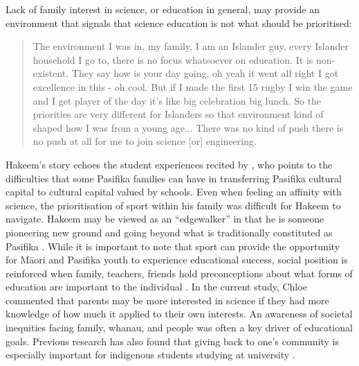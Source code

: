 Lack of family interest in science, or education in general, may provide an environment that signals that science education is not what should be prioritised: \blockquote{The environment I was in, my family, I am an Islander guy, every Islander household I go to, there is no focus whatsoever on education. It is non-existent. They say how is your day going, oh yeah it went all right I got excellence in this - oh cool. But if I made the first 15 rugby I win the game and I get player of the day it's like big celebration big lunch. So the priorities are very different for Islanders so that environment kind of shaped how I was from a young age... There was no kind of push there is no push at all for me to join science [or] engineering.}. Hakeem's story echoes the student experiences recited by \cite{mila2011polycultural}, who points to the difficulties that some Pasifika families can have in transferring Pasifika cultural capital to cultural capital valued by schools. Even when feeling an affinity with science, the prioritisation of sport within his family was difficult for Hakeem to navigate. Hakeem may be viewed as an ``edgewalker'' \citep{krebs1999edgewalkers,tupuola2004pasifika} in that he is someone pioneering new ground and going beyond what is traditionally constituted as Pasifika \cite[p.8]{mila2011polycultural}.  While it is important to note that sport can provide the opportunity for M\={a}ori and Pasifika youth to experience educational success, social position is reinforced when family, teachers, friends hold preconceptions about what forms of education are important to the individual \citep{fitzpatrick2013brown}. In the current study, Chloe commented that parents may be more interested in science if they had more knowledge of how much it applied to their own interests. An awareness of societal inequities facing family, whanau, and people was often a key driver of educational goals. Previous research has also found that giving back to one's community is especially important for indigenous students studying at university \citep{mayeda2014you}.


